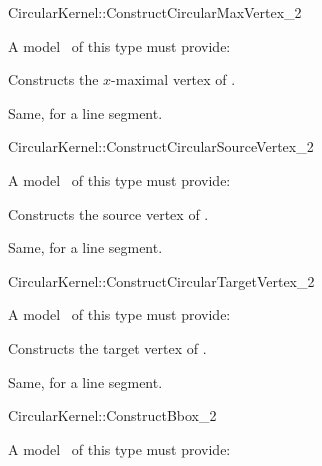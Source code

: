 \begin{ccRefFunctionObjectConcept}{CircularKernel::ConstructCircularMaxVertex_2} 


A model \ccVar\ of this type must provide:

{Constructs the $x$-maximal vertex of .
}

{Same, for a line segment.}

\end{ccRefFunctionObjectConcept}
\begin{ccRefFunctionObjectConcept}{CircularKernel::ConstructCircularSourceVertex_2} 


A model \ccVar\ of this type must provide:

{Constructs the source vertex of .}

{Same, for a line segment.}

\end{ccRefFunctionObjectConcept}
\begin{ccRefFunctionObjectConcept}{CircularKernel::ConstructCircularTargetVertex_2} 


A model \ccVar\ of this type must provide:

{Constructs the target vertex of .}

{Same, for a line segment.}

\end{ccRefFunctionObjectConcept}
\begin{ccRefFunctionObjectConcept}{CircularKernel::ConstructBbox_2}


A model \ccVar\ of this type must provide:

{}

{}

{}

\end{ccRefFunctionObjectConcept}

